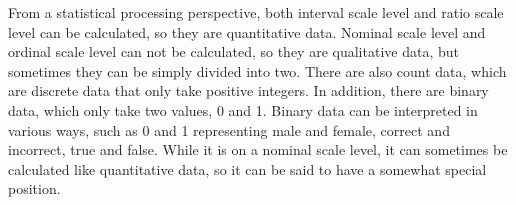 \documentclass{ltjsbook}
\begin{document}
From a statistical processing perspective, both interval scale level and ratio scale level can be calculated, so they are quantitative data. Nominal scale level and ordinal scale level can not be calculated, so they are qualitative data, but sometimes they can be simply divided into two. There are also count data, which are discrete data that only take positive integers. In addition, there are binary data, which only take two values, 0 and 1. Binary data can be interpreted in various ways, such as 0 and 1 representing male and female, correct and incorrect, true and false. While it is on a nominal scale level, it can sometimes be calculated like quantitative data, so it can be said to have a somewhat special position.

\end{document}
